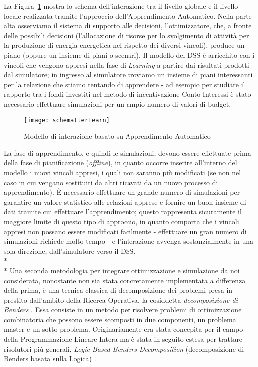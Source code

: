 \documentclass[12pt,a4paper,openright,twoside]{report}
\begin{document}
La Figura~\ref{schemaIterLearn} mostra lo schema dell'interazione tra il livello globale e il livello locale realizzata tramite l'approccio dell'Apprendimento Automatico. Nella parte alta osserviamo il sistema di supporto alle decisioni, l'ottimizzatore, che, a fronte delle possibili decisioni (l'allocazione di risorse per lo svolgimento di attività per la produzione di energia energetica nel rispetto dei diversi vincoli), produce un piano (oppure un insieme di piani o scenari). Il modello del DSS è arricchito con i vincoli che vengono appresi nella fase di \emph{Learning} a partire dai risultati prodotti dal simulatore; in ingresso al simulatore troviamo un insieme di piani interessanti per la relazione che stiamo tentando di apprendere - ad esempio per studiare il rapporto tra i fondi investiti nel metodo di incentivazione Conto Interessi è stato necessario effettuare simulazioni per un ampio numero di valori di budget. 
\begin{figure}[htb]
	\begin{center}
	\texttt{[image: schemaIterLearn]}
	\end{center}
	\caption{Modello di interazione basato su Apprendimento Automatico}
  	\label{schemaIterLearn}
\end{figure}

La fase di apprendimento, e quindi le simulazioni, devono essere effettuate prima della fase di pianificazione (\emph{offline}), in quanto occorre inserire all'interno del modello i nuovi vincoli appresi, i quali non saranno più modificati (se non nel caso in cui vengano sostituiti da altri ricavati da un nuovo processo di apprendimento). \`E necessario effettuare un grande numero di simulazioni per garantire un valore statistico alle relazioni apprese e fornire un buon insieme di dati tramite cui effettuare l'apprendimento; questo rappresenta sicuramente il maggiore limite di questo tipo di approccio, in quanto comporta che i vincoli appresi non possano essere modificati facilmente - effettuare un gran numero di simulazioni richiede molto tempo - e l'interazione avvenga sostanzialmente in una sola direzione, dall'simulatore verso il DSS.
\\*\\*
Una seconda metodologia per integrare ottimizzazione e simulazione da noi considerata, nonostante non sia stata concretamente implementata a differenza della prima, è una tecnica classica di decomposizione dei problemi presa in prestito dall'ambito della Ricerca Operativa, la cosiddetta \emph{decomposizione di Benders} \cite{bendersDec}. Essa consiste in un metodo per risolvere problemi di ottimizzazione combinatoria che possono essere scomposti in due componenti, un problema master e un sotto-problema. Originariamente era stata concepita per il campo della Programmazione Lineare Intera ma è stata in seguito estesa per trattare risolutori più generali, \emph{Logic-Based Benders Decomposition} (decomposizione di Benders basata sulla Logica) \cite{Hooker95logic-basedbenders}. 
\end{document}
